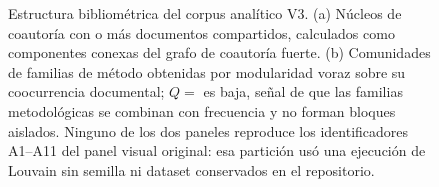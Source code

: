 \begin{figure}[!htbp]
  \caption[Estructura bibliométrica del corpus: coautoría y método.]{Estructura
  bibliométrica del corpus analítico V3. (a) Núcleos de coautoría con \LitCoauthorThreshold{}
  o más documentos compartidos, calculados como componentes conexas del grafo
  de coautoría fuerte. (b) Comunidades de familias de método obtenidas por
  modularidad voraz sobre su coocurrencia documental; $Q=$\LitMethodModularity{}
  es baja, señal de que las familias metodológicas se combinan con frecuencia y
  no forman bloques aislados. Ninguno de los dos paneles reproduce los
  identificadores A1--A11 del panel visual original: esa partición usó una
  ejecución de Louvain sin semilla ni dataset conservados en el repositorio.}
  \label{fig:lit-bibliometric}
\end{figure}

